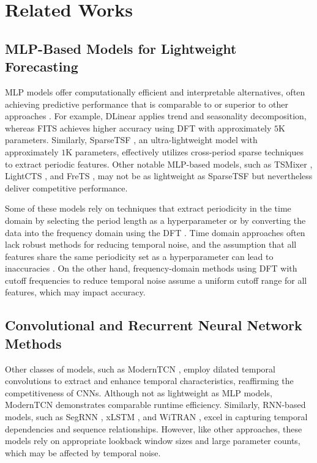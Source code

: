 \section{Related Works}
\label{sec: related works}

\subsection{MLP-Based Models for Lightweight Forecasting} \label{sub sec: related works MLP}
\ac{MLP} models offer computationally efficient and interpretable alternatives, often achieving predictive performance that is comparable to or superior to other approaches \cite{zeng2023transformers,xu2023fits,ekambaram2023tsmixer}. For example, DLinear \cite{zeng2023transformers} applies trend and seasonality decomposition, whereas FITS \cite{xu2023fits} achieves higher accuracy using \ac{DFT} with approximately $5$K parameters. Similarly, SparseTSF \cite{lin2024sparsetsf}, an ultra-lightweight model with approximately $1$K parameters, effectively utilizes cross-period sparse techniques to extract periodic features. Other notable \ac{MLP}-based models, such as TSMixer \cite{ekambaram2023tsmixer}, LightCTS \cite{lai2023lightcts}, and FreTS \cite{yi2024frequency}, may not be as lightweight as SparseTSF but nevertheless deliver competitive performance. 

Some of these models rely on techniques that extract periodicity in the time domain by selecting the period length as a hyperparameter \cite{lin2024sparsetsf,yi2024frequency} or by converting the data into the frequency domain using the \ac{DFT} \cite{xu2023fits,yi2024frequency}. Time domain approaches often lack robust methods for reducing temporal noise, and the assumption that all features share the same periodicity set as a hyperparameter can lead to inaccuracies \cite{lin2024sparsetsf}. On the other hand, frequency-domain methods using \ac{DFT} with cutoff frequencies to reduce temporal noise assume a uniform cutoff range for all features, which may impact accuracy.


\subsection{Convolutional and Recurrent Neural Network Methods} \label{sub sec: related works CNN}

Other classes of models, such as ModernTCN \cite{luo2024moderntcn}, employ dilated temporal convolutions to extract and enhance temporal characteristics, reaffirming the competitiveness of \ac{CNN}s. Although not as lightweight as \ac{MLP} models, ModernTCN demonstrates comparable runtime efficiency. Similarly, \ac{RNN}-based models, such as SegRNN \cite{lin2023segrnn}, xLSTM \cite{alharthi2024xlstmtime}, and WiTRAN \cite{jia2024witran}, excel in capturing temporal dependencies and sequence relationships. However, like other approaches, these models rely on appropriate lookback window sizes and large parameter counts, which may be affected by temporal noise.

